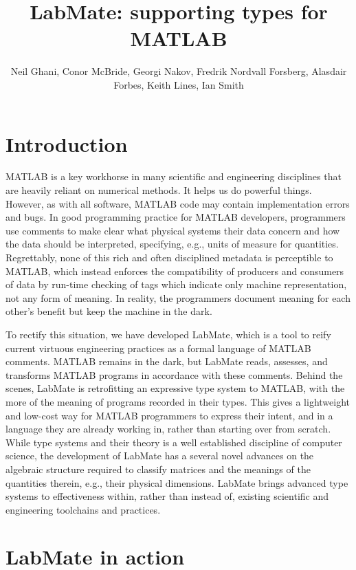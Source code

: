 \documentclass{ws-procs9x6}
\begin{document}
\title{LabMate: supporting types for MATLAB}
\author{Neil Ghani, Conor McBride, Georgi Nakov, Fredrik Nordvall Forsberg, Alasdair Forbes, Keith Lines, Ian Smith}
\address{University of Strathclyde, National Physical Laboratory}

\bodymatter

\section{Introduction}

MATLAB is a key workhorse in many scientific and engineering
disciplines that are heavily reliant on numerical methods. It helps us
do powerful things. However, as with all software, MATLAB code may
contain implementation errors and bugs. In good programming practice
for MATLAB developers, programmers use comments to make clear what
physical systems their data concern and how the data should be
interpreted, specifying, e.g., units of measure for
quantities. Regrettably, none of this rich and often disciplined
metadata is perceptible to MATLAB, which instead enforces the
compatibility of producers and consumers of data by run-time checking
of tags which indicate only machine representation, not any form of
meaning. In reality, the programmers document meaning for each other's
benefit but keep the machine in the dark.

To rectify this situation, we have developed LabMate, which is a tool
to reify current virtuous engineering practices as a formal language
of MATLAB comments. MATLAB remains in the dark, but LabMate reads,
assesses, and transforms MATLAB programs in accordance with these
comments.
%
Behind the scenes, LabMate is retrofitting an expressive type system
to MATLAB, with the more of the meaning of programs recorded in their
types.
%
This gives a lightweight and low-cost way for MATLAB programmers to
express their intent, and in a language they are already working in,
rather than starting over from scratch.
%
While type systems and their theory is a well established discipline
of computer science, the development of LabMate has a several novel
advances on the algebraic structure required to classify
matrices and the meanings of the quantities therein, e.g., their
physical dimensions. LabMate brings advanced type systems to
effectiveness within, rather than instead of, existing scientific and
engineering toolchains and practices.

\section{LabMate in action}
\label{sec:example}
\end{document}
